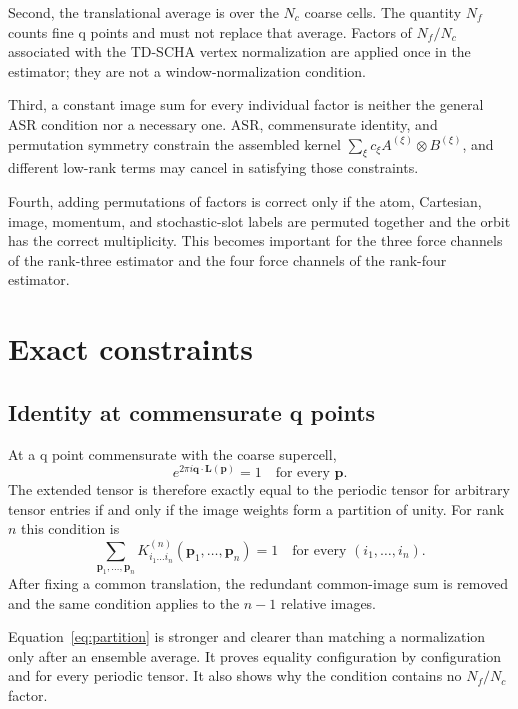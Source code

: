 \documentclass{article}
\newcommand{\Nc}{N_c}
\newcommand{\Nf}{N_f}
\begin{document}
Second, the translational average is over the $\Nc$ coarse cells. The
quantity $\Nf$ counts fine q points and must not replace that average.
Factors of $\Nf/\Nc$ associated with the TD-SCHA vertex normalization are
applied once in the estimator; they are not a window-normalization
condition.

Third, a constant image sum for every individual factor is neither the
general ASR condition nor a necessary one. ASR, commensurate identity, and
permutation symmetry constrain the assembled kernel
$\sum_\xi c_\xi A^{(\xi)}\otimes B^{(\xi)}$, and different low-rank terms
may cancel in satisfying those constraints.

Fourth, adding permutations of factors is correct only if the atom,
Cartesian, image, momentum, and stochastic-slot labels are permuted
together and the orbit has the correct multiplicity. This becomes important
for the three force channels of the rank-three estimator and the four force
channels of the rank-four estimator.

\section{Exact constraints}
\label{sec:constraints}

\subsection{Identity at commensurate q points}
\label{sec:commensurate}

At a q point commensurate with the coarse supercell,
\begin{equation}
    e^{2\pi i\bm q\cdot\bm L(\bm p)}=1
    \quad\text{for every }\bm p.
    \label{eq:commensurate-phase}
\end{equation}
The extended tensor is therefore exactly equal to the periodic tensor for
arbitrary tensor entries if and only if the image weights form a partition
of unity. For rank $n$ this condition is
\begin{equation}
    \sum_{\bm p_1,\ldots,\bm p_n}
    K^{(n)}_{i_1\ldots i_n}
    (\bm p_1,\ldots,\bm p_n)
    =1
    \quad\text{for every }(i_1,\ldots,i_n).
    \label{eq:partition}
\end{equation}
After fixing a common translation, the redundant common-image sum is
removed and the same condition applies to the $n-1$ relative images.

Equation~\eqref{eq:partition} is stronger and clearer than matching a
normalization only after an ensemble average. It proves equality
configuration by configuration and for every periodic tensor. It also
shows why the condition contains no $\Nf/\Nc$ factor.
\end{document}
